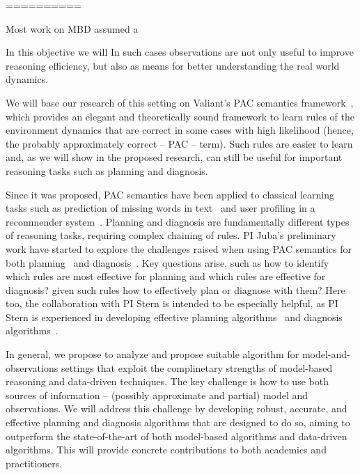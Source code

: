 







==========



Most work on MBD assumed a 



In this objective we will 
In such cases observations are not only useful to improve reasoning efficiency, but also as means for better understanding the real world dynamics. 

We will base our research of this setting on Valiant's PAC semantics framework~\cite{valiant2000robustLogics,valiant2000neuroidal}, which provides an elegant and theoretically sound framework to learn 
rules of the environment dynamics that are correct in some cases with high likelihood (hence, the probably approximately correct -- PAC -- term). 
Such rules are easier to learn and, as we will show in the proposed research, can still be useful for important reasoning tasks such as planning and diagnosis. 

Since it was proposed, PAC semantics have been applied to classical learning tasks such as prediction of missing words in text~\cite{michael2008first} and user profiling in a recommender system~\cite{semeraro2009knowledge}. Planning and diagnosis are fundamentally different types of reasoning tasks, requiring complex chaining of rules. PI Juba's preliminary work have started to explore the challenges raised when using PAC semantics for both planning~\cite{juba2016jmlr} and diagnosis~\cite{juba2016aaai}. Key questions arise, such as how to identify which rules are most effective for planning and which rules are effective for diagnosis? given such rules how to effectively plan or diagnose with them? 
Here too, the collaboration with PI Stern is intended to be especially helpful, as PI Stern is experienced in developing effective planning algorithms~\cite{stern2010usingLookahead,stern2014potential,gilon2016dynamic,sharon2013increasing,sharon2015conflict,gilon2016dynamic} and diagnosis algorithms~\cite{stern2012exploring,metodi2014novel,lazebnik2016solving,elmishali2016dataAugmented}.



In general, we propose to analyze and propose suitable algorithm for model-and-observations settings 
that exploit the complinetary strengths of model-based reasoning and data-driven techniques. The key challenge is how to use both sources of information -- (possibly approximate and partial) model and observations. We will address this challenge by developing robust, accurate, and effective planning and diagnosis algorithms that are designed to do so, aiming to outperform the state-of-the-art of both model-based algorithms and data-driven algorithms. This will provide concrete contributions to both academics and practitioners. 

